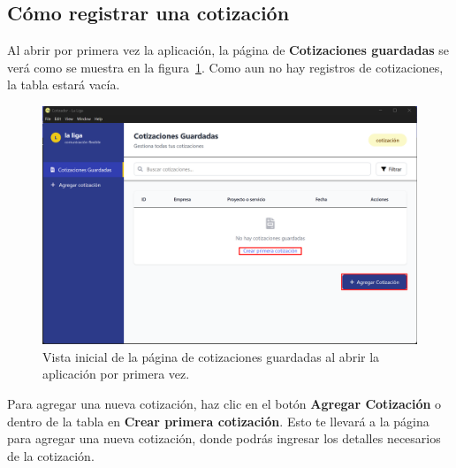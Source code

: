 \documentclass{Pretexto/bluereport}
\begin{document}
\begin{minipage}
\subsection{Cómo registrar una cotización}
Al abrir por primera vez la aplicación, la página de \textbf{Cotizaciones guardadas} se verá como se muestra en la figura~\ref{fig:vista_inicial}.
Como aun no hay registros de cotizaciones, la tabla estará vacía. 
    \begin{figure}[H]
        \centering
            \includegraphics[width=0.85\linewidth]{img/abrir_primera_vez.png}
        \caption{Vista inicial de la página de cotizaciones guardadas al abrir la aplicación por primera vez.}
        \label{fig:vista_inicial}
    \end{figure}
Para agregar una nueva cotización, haz clic en el botón \textbf{Agregar Cotización} o dentro de
la tabla en \textbf{Crear primera cotización}. Esto te llevará a la página para agregar una nueva cotización, donde podrás ingresar los 
detalles necesarios de la cotización.


\end{minipage}
\end{document}
